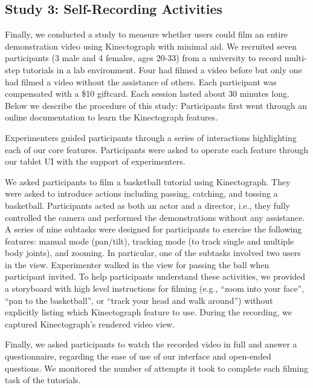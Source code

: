 \subsection{Study 3: Self-Recording Activities}

Finally, we conducted a study to measure whether users could film an entire demonstration video using Kinectograph with minimal aid.
%
We recruited seven participants (3 male and 4 females, ages 20-33) from a university to record multi-step tutorials in a lab environment. Four had filmed a video before but only one had filmed a video without the assistance of others. Each participant was compensated with a \$10 giftcard. Each session lasted about 30 minutes long.
Below we describe the procedure of this study:
 Participants first went through an online documentation to learn the Kinectograph features. %

 Experimenters guided participants through a series of interactions highlighting each of our core features. Participants were asked to operate each feature through our tablet UI with the support of experimenters.

 We asked participants to film a basketball tutorial using Kinectograph. They were asked to introduce actions including passing, catching, and tossing a basketball. Participants acted as both an actor and a director, i.e., they fully controlled the camera and performed the demonstrations without any assistance. A series of nine subtasks were designed for participants to exercise the following features: manual mode (pan/tilt), tracking mode (to track single and multiple body joints), and zooming. In particular, one of the subtasks involved two users in the view. Experimenter walked in the view for passing the ball when participant invited. To help participants understand these activities, we provided a storyboard with high level instructions for filming (e.g., ``zoom into your face'', ``pan to the basketball'', or ``track your head and walk around'') without explicitly listing which Kinectograph feature to use. During the recording, we captured Kinectograph's rendered video view.

 Finally, we asked participants to watch the recorded video in full and answer a questionnaire, regarding the ease of use of our interface and open-ended questions. We monitored the number of attempts it took to complete each filming task of the tutorials.

